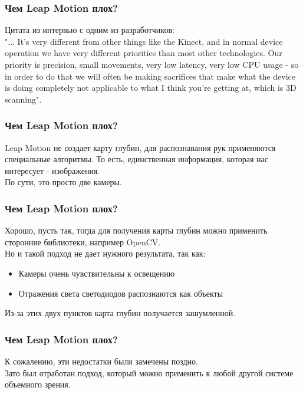 \documentclass{beamer}
\begin{document}
		\begin{frame}
			\frametitle{Чем Leap Motion плох?}
			
			Цитата из интервью с одним из разработчиков:\\
			"... It’s very different from other things like the Kinect, and in normal device
			operation we have very different priorities than most other technologies.
			Our priority is precision, small movements, very low latency, very low CPU
			usage - so in order to do that we will often be making sacrifices that make
			what the device is doing completely not applicable to what I think you’re
			getting at, which is 3D scanning".
		\end{frame}
		
		\begin{frame}
			\frametitle{Чем Leap Motion плох?}
			
			Leap Motion не создает карту глубин, для распознавания рук применяются специальные
			алгоритмы. То есть, единственная информация, которая нас интересует - изображения.\\
			По сути, это просто две камеры.
		\end{frame}
		
		\begin{frame}
			\frametitle{Чем Leap Motion плох?}
				
			Хорошо, пусть так, тогда для получения карты глубин можно применить сторонние библиотеки,
			например OpenCV.\\
			Но и такой подход не дает нужного результата, так как:\\
			
			\begin{itemize}
				\item Камеры очень чувствительны к освещению
				\item Отражения света светодиодов распознаются как объекты
			\end{itemize}
			
			Из-за этих двух пунктов карта глубин получается зашумленной.
		\end{frame}
		
		\begin{frame}
			\frametitle{Чем Leap Motion плох?}
			
			К сожалению, эти недостатки были замечены поздно.\\
			Зато был отработан подход, который можно применить к любой другой
			системе объемного зрения.
		\end{frame}
		
\end{document}
